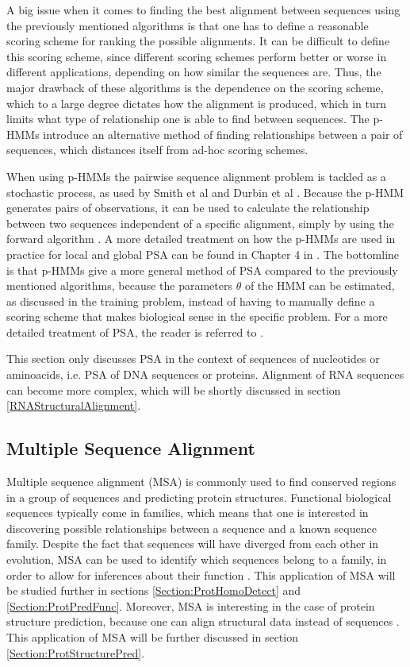 \documentclass{article}\usepackage[]{graphicx}\usepackage[]{color}
\begin{document}
A big issue when it comes to finding the best alignment between sequences using the previously mentioned algorithms is that one has to define a reasonable scoring scheme for ranking the possible alignments. It can be difficult to define this scoring scheme, since different scoring schemes perform better or worse in different applications, depending on how similar the sequences are. Thus, the major drawback of these algorithms is the dependence on the scoring scheme, which to a large degree dictates how the alignment is produced, which in turn limits what type of relationship one is able to find between sequences. The p-HMMs introduce an alternative method of finding relationships between a pair of sequences, which distances itself from ad-hoc scoring schemes. 

When using p-HMMs the pairwise sequence alignment problem is tackled as a stochastic process, as used by Smith et al \cite{Smith2003} and Durbin et al \cite{Durbin1998}. Because the p-HMM generates pairs of observations, it can be used to calculate the relationship between two sequences independent of a specific alignment, simply by using the forward algorithm \cite{Choo2004}. A more detailed treatment on how the p-HMMs are used in practice for local and global PSA can be found in Chapter 4 in \cite{Durbin1998}. The bottomline is that p-HMMs give a more general method of PSA compared to the previously mentioned algorithms, because the parameters $\theta$ of the HMM can be estimated, as discussed in the training problem, instead of having to manually define a scoring scheme that makes biological sense in the specific problem. For a more detailed treatment of PSA, the reader is referred to \cite{Durbin1998}.

This section only discusses PSA in the context of sequences of nucleotides or aminoacids, i.e. PSA of DNA sequences or proteins. Alignment of RNA sequences can become more complex, which will be shortly discussed in section \ref{RNAStructuralAlignment}.

\subsection{Multiple Sequence Alignment}\label{Section:MSA}
Multiple sequence alignment (MSA) is commonly used to find conserved regions in a group of sequences and predicting protein structures. Functional biological sequences typically come in families, which means that one is interested in discovering possible relationships between a sequence and a known sequence family. Despite the fact that sequences will have diverged from each other in evolution, MSA can be used to identify which sequences belong to a family, in order to allow for inferences about their function \cite{Durbin1998}. This application of MSA will be studied further in sections \ref{Section:ProtHomoDetect} and \ref{Section:ProtPredFunc}. Moreover, MSA is interesting in the case of protein structure prediction, because one can align structural data instead of sequences \cite{Eddy1998}. This application of MSA will be further discussed in section \ref{Section:ProtStructurePred}. 
\end{document}
